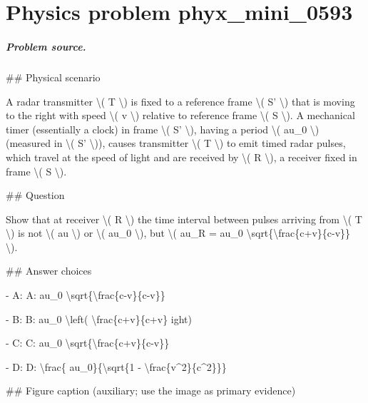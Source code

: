 
\chapter{Physics problem phyx\_mini\_0593}
\label{ch:PhyXMiniProblems_problem_phyx_mini_0593}

\paragraph{Problem source.}
\#\# Physical scenario

A radar transmitter \textbackslash{}( T \textbackslash{}) is fixed to a reference frame \textbackslash{}( S' \textbackslash{}) that is moving to the right with speed \textbackslash{}( v \textbackslash{}) relative to reference frame \textbackslash{}( S \textbackslash{}). A mechanical timer (essentially a clock) in frame \textbackslash{}( S' \textbackslash{}), having a period \textbackslash{}( 	au\_0 \textbackslash{}) (measured in \textbackslash{}( S' \textbackslash{})), causes transmitter \textbackslash{}( T \textbackslash{}) to emit timed radar pulses, which travel at the speed of light and are received by \textbackslash{}( R \textbackslash{}), a receiver fixed in frame \textbackslash{}( S \textbackslash{}).

\#\# Question

Show that at receiver \textbackslash{}( R \textbackslash{}) the time interval between pulses arriving from \textbackslash{}( T \textbackslash{}) is not \textbackslash{}( 	au \textbackslash{}) or \textbackslash{}( 	au\_0 \textbackslash{}), but \textbackslash{}( 	au\_R = 	au\_0 \textbackslash{}sqrt\{\textbackslash{}frac\{c+v\}\{c-v\}\} \textbackslash{}).

\#\# Answer choices

- A: A: 	au\_0 \textbackslash{}sqrt\{\textbackslash{}frac\{c-v\}\{c-v\}\}

- B: B: 	au\_0 \textbackslash{}left( \textbackslash{}frac\{c+v\}\{c+v\} 
ight)

- C: C: 	au\_0 \textbackslash{}sqrt\{\textbackslash{}frac\{c+v\}\{c-v\}\}

- D: D: \textbackslash{}frac\{	au\_0\}\{\textbackslash{}sqrt\{1 - \textbackslash{}frac\{v\textasciicircum{}2\}\{c\textasciicircum{}2\}\}\}

\#\# Figure caption (auxiliary; use the image as primary evidence)

